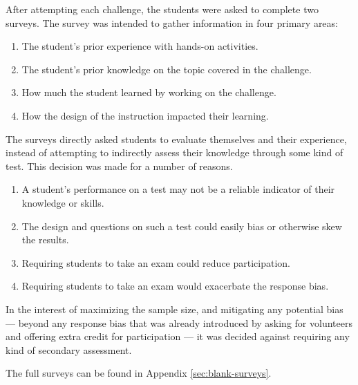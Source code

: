     After attempting each challenge, the students were asked to complete two surveys. %
The survey was intended to gather information in four primary areas:
    \begin{enumerate}
        \item The student's prior experience with hands-on activities.
        \item The student's prior knowledge on the topic covered in the challenge.
        \item How much the student learned by working on the challenge.
        \item How the design of the instruction impacted their learning. 
    \end{enumerate}
    
    The surveys directly asked students to evaluate themselves and their experience, instead of attempting to indirectly assess their knowledge through some kind of test. %
This decision was made for a number of reasons. 
    \begin{enumerate}
        \item A student's performance on a test may not be a reliable indicator of their knowledge or skills.
        \item The design and questions on such a test could easily bias or otherwise skew the results. 
        \item Requiring students to take an exam could reduce participation. 
        \item Requiring students to take an exam would exacerbate the response bias.
    \end{enumerate}

    In the interest of maximizing the sample size, and mitigating any potential bias ---%
 beyond any response bias that was already introduced by asking for volunteers and offering extra credit for participation ---%
 it was decided against requiring any kind of secondary assessment. 

    
    The full surveys can be found in Appendix \ref{sec:blank-surveys}.


